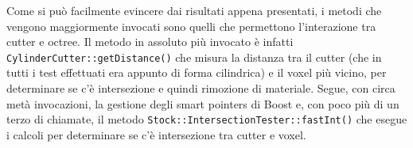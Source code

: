 Come si può facilmente evincere dai risultati appena presentati, i metodi che vengono maggiormente invocati sono quelli che permettono l'interazione tra cutter e octree. Il metodo in assoluto più invocato è infatti \texttt{CylinderCutter::getDistance()} che misura la distanza tra il cutter (che in tutti i test effettuati era appunto di forma cilindrica) e il voxel più vicino, per determinare se c'è intersezione e quindi rimozione di materiale. Segue, con circa metà invocazioni, la gestione degli smart pointers di Boost e, con poco più di un terzo di chiamate, il metodo \texttt{Stock::IntersectionTester::fastInt()} che esegue i calcoli per determinare se c'è intersezione tra cutter e voxel.
